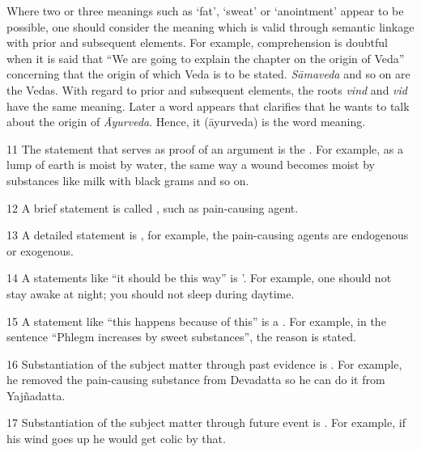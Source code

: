 \begin{translation}
   Where two or three meanings such as `fat’, `sweat’ or `anointment’ appear to be possible, one should consider the meaning which is valid through semantic linkage with prior and subsequent elements. For example, comprehension is doubtful when it is said that “We are going to explain the chapter on the origin of Veda” concerning that the origin of which Veda is to be stated. \emph{Sāmaveda} and so on are the Vedas. With regard to prior and subsequent elements, the roots \emph{vind} and \emph{vid} have the same meaning. Later a word appears that clarifies that he wants to talk about the origin of \emph{Āyurveda}. Hence, it (āyurveda) is the word meaning.  

\item [11] The statement that serves as proof of an argument is the 
. For example, as a lump of earth is moist by water, the 
same way a wound becomes moist by substances like milk with black grams and 
so on.  

\item [12] A brief statement is called , such as 
 {pain-causing agent}. 

\item [13] A detailed statement is , for example, the 
pain-causing agents are endogenous or exogenous. 

\item [14] A statements like ``it should be this way'' is 
'. For example, one should not stay awake at night; 
you should not sleep during daytime.  

\item [15] A statement like “this happens because of this” is a 
. For example, in the sentence “Phlegm 
increases by sweet substances”, the reason is stated.  

\item [16] Substantiation of the subject matter through past evidence is 
. For example, he removed the pain-causing substance 
from Devadatta so he can do it from Yajñadatta. 

\item [17] Substantiation of the subject matter through future event is 
. For example, if his wind goes up he would get colic by 
that.  



\end{translation}
